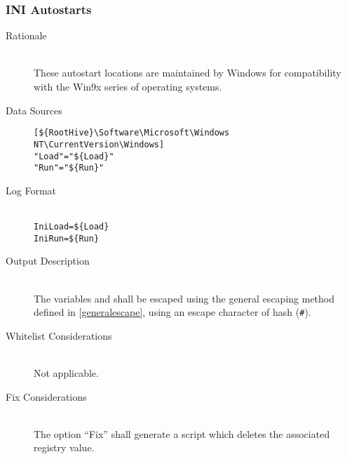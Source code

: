 \subsubsection{INI Autostarts}
\begin{description}
\item[Rationale] \hfill \\
These autostart locations are maintained by Windows for compatibility with the
Win9x series of operating systems.
\item[Data Sources] \hfill
\vspace{-\baselineskip}
\begin{verbatim}
[${RootHive}\Software\Microsoft\Windows NT\CurrentVersion\Windows]
"Load"="${Load}"
"Run"="${Run}"
\end{verbatim}
\item[Log Format] \hfill \\
\verb|IniLoad=${Load}| \\
\verb|IniRun=${Run}|
\item[Output Description] \hfill \\
The variables  and  shall be escaped using the general
escaping method defined in \ref{generalescape}, using an escape character of
hash (\verb|#|).
\item[Whitelist Considerations] \hfill \\
Not applicable.
\item[Fix Considerations] \hfill \\
The option ``Fix'' shall generate a script which deletes the associated
registry value.
\end{description}

